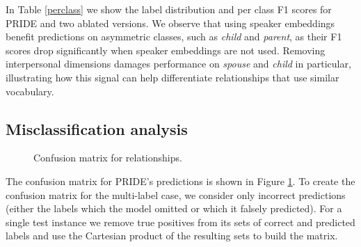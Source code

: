 In Table \ref{perclass} we show the label distribution and per class F1 scores for PRIDE and two ablated versions.
We observe that using speaker embeddings benefit predictions on asymmetric classes, such as \emph{child} and \emph{parent}, as their F1 scores drop significantly when speaker embeddings are not used. Removing interpersonal dimensions damages performance on \textit{spouse} and \textit{child} in particular, illustrating  how this signal can help differentiate relationships that use similar vocabulary.


\subsection{Misclassification analysis}

\begin{figure}[t!]
\centering
{}
\caption{Confusion matrix for relationships.}
\label{confusion}
\end{figure}

The confusion matrix for PRIDE's predictions is shown in Figure \ref{confusion}. To create the confusion matrix for the multi-label case, we consider only incorrect predictions (either the labels which the model omitted or which it falsely predicted). For a single test instance we remove true positives from its sets of correct and predicted labels and use the Cartesian product of the resulting sets to build the matrix.

